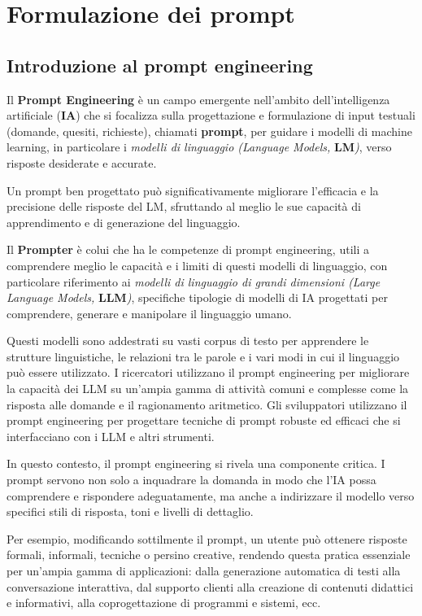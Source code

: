 \section{Formulazione dei prompt}

    \subsection{Introduzione al prompt engineering}
        Il \textbf{Prompt Engineering} è un campo emergente nell'ambito dell'intelligenza artificiale (\textbf{IA}) che si focalizza sulla progettazione e formulazione di input testuali (domande, quesiti, richieste), chiamati \textbf{prompt}, per guidare i modelli di machine learning, in particolare i \textit{modelli di linguaggio (Language Models, }\textbf{LM}\textit{)}, verso risposte desiderate e accurate.

        Un prompt ben progettato può significativamente migliorare l'efficacia e la precisione delle risposte del LM, sfruttando al meglio le sue capacità di apprendimento e di generazione del linguaggio.
        
        Il \textbf{Prompter} è colui che ha le competenze di prompt engineering, utili a comprendere meglio le capacità e i limiti di questi modelli di linguaggio, con particolare riferimento ai \textit{modelli di linguaggio di grandi dimensioni (Large Language Models, }\textbf{LLM}\textit{)}, specifiche tipologie di modelli di IA progettati per comprendere, generare e manipolare il linguaggio umano.
        
        Questi modelli sono addestrati su vasti corpus di testo per apprendere le strutture linguistiche, le relazioni tra le parole e i vari modi in cui il linguaggio può essere utilizzato. I ricercatori utilizzano il prompt engineering per migliorare la capacità dei LLM su un'ampia gamma di attività comuni e complesse come la risposta alle domande e il ragionamento aritmetico. Gli sviluppatori utilizzano il prompt engineering per progettare tecniche di prompt robuste ed efficaci che si interfacciano con i LLM e altri strumenti.
        
        In questo contesto, il prompt engineering si rivela una componente critica. I prompt servono non solo a inquadrare la domanda in modo che l'IA possa comprendere e rispondere adeguatamente, ma anche a indirizzare il modello verso specifici stili di risposta, toni e livelli di dettaglio.
        
        Per esempio, modificando sottilmente il prompt, un utente può ottenere risposte formali, informali, tecniche o persino creative, rendendo questa pratica essenziale per un'ampia gamma di applicazioni: dalla generazione automatica di testi alla conversazione interattiva, dal supporto clienti alla creazione di contenuti didattici e informativi, alla coprogettazione di programmi e sistemi, ecc.
        
